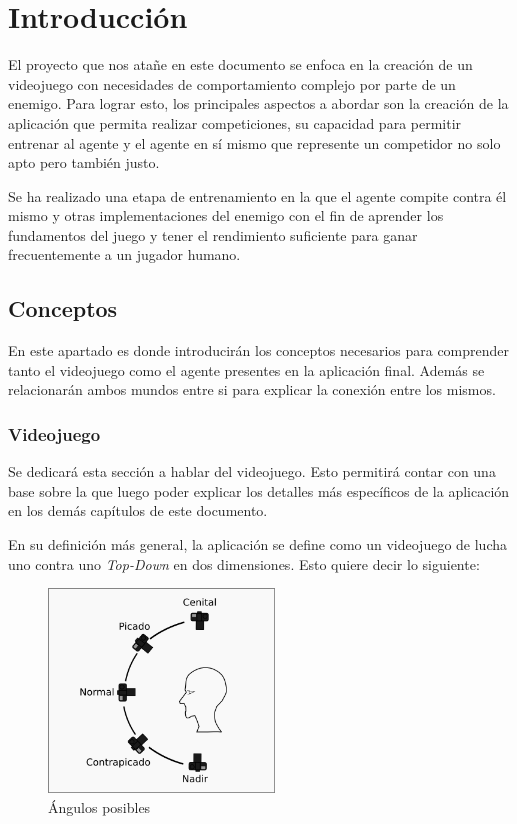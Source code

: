 \chapter{Introducción}

El proyecto que nos atañe en este documento se enfoca en la creación de un videojuego con necesidades de comportamiento complejo por parte de un enemigo. Para lograr esto, los principales aspectos a abordar son la creación de la aplicación que permita realizar competiciones, su capacidad para permitir entrenar al agente y el agente en sí mismo que represente un competidor no solo apto pero también justo.

\bigskip

Se ha realizado una etapa de entrenamiento en la que el agente compite contra él mismo y otras implementaciones del enemigo con el fin de aprender los fundamentos del juego y tener el rendimiento suficiente para ganar frecuentemente a un jugador humano.

\section{Conceptos}

En este apartado es donde introducirán los conceptos necesarios para comprender tanto el videojuego como el agente presentes en la aplicación final. Además se relacionarán ambos mundos entre si para explicar la conexión entre los mismos.

\subsection{Videojuego}

Se dedicará esta sección a hablar del videojuego. Esto permitirá contar con una base sobre la que luego poder explicar los detalles más específicos de la aplicación en los demás capítulos de este documento.

\bigskip

En su definición más general, la aplicación se define como un videojuego de lucha uno contra uno \textit{Top-Down} en dos dimensiones. Esto quiere decir lo siguiente:

\begin{figure}
	\centerline{\includegraphics[width=6cm]{otros/manual/angulos.png}}
	\caption{Ángulos posibles}
	\label{mec:angulos}
\end{figure}

